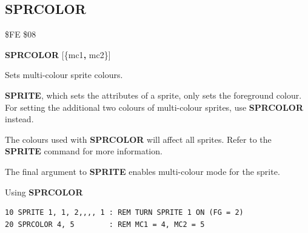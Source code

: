 
\newpage
\subsection{SPRCOLOR}
\begin{description}[leftmargin=2cm,style=nextline]
\item [Token:]    \$FE \$08

\item [Format:]   {\bf SPRCOLOR} [\{mc1{\bf,} mc2\}]

\item [Usage:]    Sets multi-colour sprite colours.

                  {\bf SPRITE}, which sets the attributes of a sprite, only sets the foreground colour. For setting the additional two colours of multi-colour sprites, use {\bf SPRCOLOR} instead.

\item [Remarks:]  The colours used with {\bf SPRCOLOR} will affect all sprites. Refer to the {\bf SPRITE} command for more information.

                  The final argument to {\bf SPRITE} enables multi-colour mode for the sprite.

\item [Example:]  Using {\bf SPRCOLOR}

\begin{tcolorbox}[colback=black,coltext=white]
\verbatimfont{\codefont}
\begin{verbatim}
10 SPRITE 1, 1, 2,,,, 1 : REM TURN SPRITE 1 ON (FG = 2)
20 SPRCOLOR 4, 5        : REM MC1 = 4, MC2 = 5
\end{verbatim}
\end{tcolorbox}
\end{description}


\newpage
